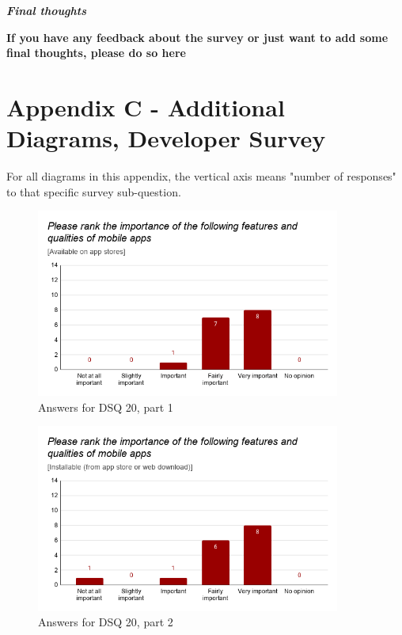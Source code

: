 \documentclass[a4paper,12pt]{article}
\begin{document}
\quad

\quad

\textbf{\textit{Final thoughts}}

\textbf{If you have any feedback about the survey or just want to add some final thoughts, please do so here}

\newpage
\section{Appendix C - Additional Diagrams, Developer Survey}
\label{Appendix_devMultiDiagrams}

For all diagrams in this appendix, the vertical axis means "number of responses" to that specific survey sub-question.

\vspace{-10px}

\begin{figure}[ht!]
    \centering
    \includegraphics[width=10cm]{img/Results/dsq20_1.png}
    \caption{Answers for DSQ 20, part 1}
    \label{fig:res_devq20_1}
\end{figure}

\vspace{-10px}

\begin{figure}[ht!]
    \centering
    \includegraphics[width=10cm]{img/Results/dsq20_2.png}
    \caption{Answers for DSQ 20, part 2}
    \label{fig:res_devq20_2}
\end{figure}
\end{document}
